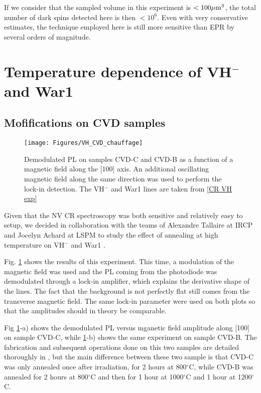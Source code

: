 \documentclass[a4paper,11pt]{report}
\begin{document}
If we consider that the sampled volume in this experiment is $< 100 \mu \rm{m}^3$, the total number of dark spins detected here is then $< 10^6$. Even with very conservative estimates, the technique employed here is still more sensitive than EPR by several orders of magnitude.

\section{Temperature dependence of VH$^-$ and War1}


\subsection{Mofifications on CVD samples}
\begin{figure}[h]
\centering
\texttt{[image: Figures/VH\_CVD\_chauffage]}
\caption{Demodulated PL on samples CVD-C and CVD-B as a function of a magnetic field along the [100] axis. An additional oscillating magnetic field along the same direction was used to perform the lock-in detection. The VH$^-$ and War1 lines are taken from \ref{CR VH exp}}
\label{chauffage CVD}
\end{figure}

Given that the NV CR spectroscopy was both sensitive and relatively easy to setup, we decided in collaboration with the teams of Alexandre Tallaire at IRCP and Jocelyn Achard at LSPM to study the effect of annealing at high temperature on VH$^-$ and War1 \citep{ngambou2022improving}.

Fig. \ref{chauffage CVD} shows the results of this experiment. This time, a modulation of the magnetic field was used and the PL coming from the photodiode was demodulated through a lock-in amplifier, which explains the derivative shape of the lines. The fact that the background is not perfectly flat still comes from the transverse magnetic field. The same lock-in parameter were used on both plots so that the amplitudes should in theory be comparable.

Fig \ref{chauffage CVD}-a) shows the demodulated PL versus mganetic field amplitude along [100] on sample CVD-C, while \ref{chauffage CVD}-b) shows the same experiment on sample CVD-B. The fabrication and subsequent operations done on this two samples are detailed thoroughly in \citep{ngambou2022improving}, but the main difference between these two sample is that CVD-C was only annealed once after irradiation, for 2 hours at 800$^\circ$C, while CVD-B was annealed for 2 hours at 800$^\circ$C and then for 1 hour at 1000$^\circ$C and 1 hour at 1200$^\circ$C.
\end{document}
